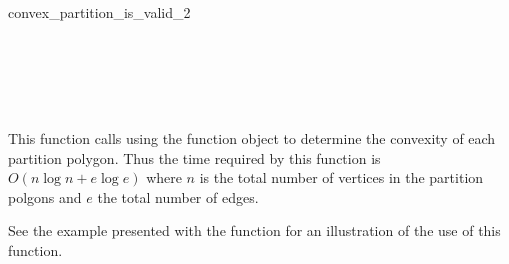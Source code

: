 \begin{ccRefFunction}{convex_partition_is_valid_2}
\ccSeeAlso

 \\
 \\
\\
 \\

\ccImplementation

This function calls  using the function object
 to determine the convexity of each partition polygon.
Thus the time required by this function is $O(n \log n + e \log e)$ where
$n$ is the total number of vertices in the partition polgons and $e$ the
total number of edges.

\ccExample

See the example presented with the function 
for an illustration of the use of this function.

\end{ccRefFunction}
\renewcommand\ccRefPageBegin{\ccParDims\cgalColumnLayout}
\renewcommand\ccRefPageEnd{\ccParDims\cgalColumnLayout}

